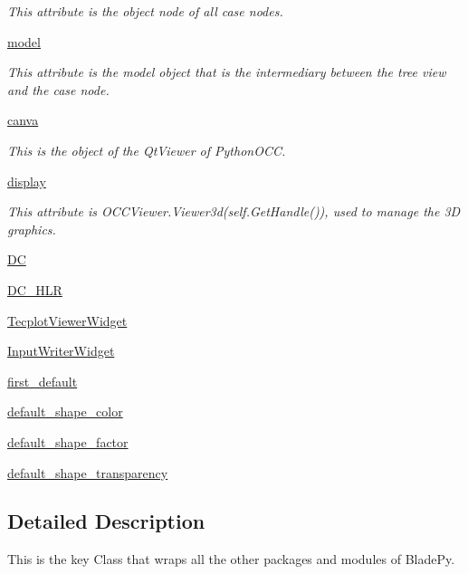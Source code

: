 \begin{DoxyCompactItemize}
\begin{DoxyCompactList}\small\item\em This attribute is the object node of all case nodes. \end{DoxyCompactList}\item 
\hyperlink{a00078_ac74bebda7bd9e99df8e5d26c0b61e0bb}{model}
\begin{DoxyCompactList}\small\item\em This attribute is the model object that is the intermediary between the tree view and the case node. \end{DoxyCompactList}\item 
\hyperlink{a00078_ab277fbfb8af6b2ef9aff8d06c9f5cc82}{canva}
\begin{DoxyCompactList}\small\item\em This is the object of the Qt\+Viewer of Python\+O\+CC. \end{DoxyCompactList}\item 
\hyperlink{a00078_abe828f3ea500c70a4abe0f376b6d8dc4}{display}
\begin{DoxyCompactList}\small\item\em This attribute is O\+C\+C\+Viewer.\+Viewer3d(self.\+Get\+Handle()), used to manage the 3D graphics. \end{DoxyCompactList}\item 
\hyperlink{a00078_a8d53bb9fe024d3235652a6233d0d61a8}{DC}
\item 
\hyperlink{a00078_a62af2479e8c1b0d3405a6122ea2be116}{D\+C\+\_\+\+H\+LR}
\item 
\hyperlink{a00078_a04f16a810669c721b389767d47c08c8f}{Tecplot\+Viewer\+Widget}
\item 
\hyperlink{a00078_a4ead2c1cc874da56fad290cca0630fc0}{Input\+Writer\+Widget}
\item 
\hyperlink{a00078_af0ce94ff8ed058ada4057b3062de1d0d}{first\+\_\+default}
\item 
\hyperlink{a00078_a74bd4997b68dd3f273e5eb6cbbbac70a}{default\+\_\+shape\+\_\+color}
\item 
\hyperlink{a00078_aafff31611ea2a5eb584f2550607e3e23}{default\+\_\+shape\+\_\+factor}
\item 
\hyperlink{a00078_a26accbeb5266ec3f792c86cf8643f696}{default\+\_\+shape\+\_\+transparency}
\end{DoxyCompactItemize}


\subsection{Detailed Description}
This is the key Class that wraps all the other packages and modules of Blade\+Py. 

